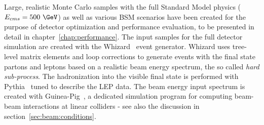 Large, realistic Monte Carlo samples with the full Standard Model physics ($E_{cms}=500~\GeV$) as well as various
BSM scenarios have been created for the purpose of detector optimization and performance evaluation, to be presented in detail in
chapter~\ref{chap:performance}. The input samples for the full detector simulation
are created with the Whizard~\cite{Kilian:2007gr} event generator.
Whizard uses tree-level matrix elements and loop corrections to generate events with the final state partons and leptons
based on a realistic beam energy spectrum, the so called \emph{hard sub-process}. The hadronization into the visible final state
is performed with Pythia~\cite{Sjostrand:2006za} tuned to describe the LEP data.
The beam energy input spectrum is created with Guinea-Pig~\cite{Schulte:1998au}, a dedicated simulation program for computing
beam-beam interactions at linear colliders - see also the discussion in section~\ref{sec:beam:conditions}.
%
